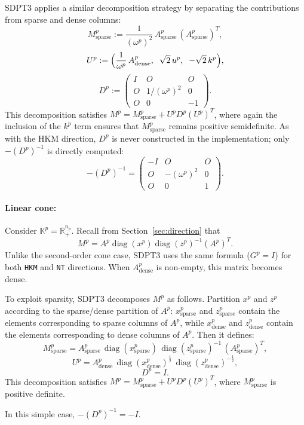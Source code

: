 SDPT3 applies a similar decomposition strategy by separating 
the contributions from sparse and dense columns:
\[
  M^p_{\mathrm{sparse}}
    := \frac{1}{(\omega^p)^2} \, A^p_{\mathrm{sparse}}\,(A^p_{\mathrm{sparse}})^T,
\]
\[
  U^p
    := \Bigl(
      \frac{1}{\omega^p}\,A^p_{\mathrm{dense}},
       \;\; \sqrt{2}\,u^p,
       \;\; -\sqrt{2}\,k^p
    \Bigr),
\]
\[
  D^p
    := \begin{pmatrix}
         I & O & O \\
         O & 1/(\omega^p)^2 & 0  \\
         O & 0 & -1 
       \end{pmatrix}.
\]
This decomposition satisfies $M^p = M^p_{\mathrm{sparse}} + U^p D^p (U^p)^T$,
where again the inclusion of the $k^p$ term ensures that $M^p_{\mathrm{sparse}}$ 
remains positive semidefinite.
As with the HKM direction, $D^p$ is never constructed in the implementation;
only $-(D^p)^{-1}$ is directly computed:
\[
  -(D^p)^{-1}
  = \begin{pmatrix}
      -I & O & O  \\
      O & -(\omega^p)^2 & 0  \\
      O & 0 & 1
    \end{pmatrix}.
\]


\paragraph{Linear cone:}
Consider $\mathbb{K}^p = \mathbb{R}^{n_p}_+$. 
Recall from Section~\ref{sec:direction} that
\[
  M^p = A^p \operatorname{diag}(x^p) \operatorname{diag}(z^p)^{-1} (A^p)^T.
\]
Unlike the second-order cone case, SDPT3 uses the same formula ($G^p=I$) 
for both \texttt{HKM} and \texttt{NT} directions.
When $A^p_{\mathrm{dense}}$ is non-empty, this matrix becomes dense.

To exploit sparsity, SDPT3 decomposes $M^p$ as follows.
Partition $x^p$ and $z^p$ according to the sparse/dense partition of $A^p$:
$x^p_{\mathrm{sparse}}$ and $z^p_{\mathrm{sparse}}$ contain the elements corresponding to sparse columns of $A^p$,
while $x^p_{\mathrm{dense}}$ and $z^p_{\mathrm{dense}}$ contain the elements corresponding to dense columns of $A^p$.
Then it defines:
\[
   M^p_{\mathrm{sparse}}
   = A^p_{\mathrm{sparse}}
     \,\operatorname{diag}(x^p_{\mathrm{sparse}})
     \,\operatorname{diag}(z^p_{\mathrm{sparse}})^{-1}
     \,(A^p_{\mathrm{sparse}})^T,
\]
\[
   U^p
   = A^p_{\mathrm{dense}}
     \,\operatorname{diag}(x^p_{\mathrm{dense}})^{\tfrac12}
     \,\operatorname{diag}(z^p_{\mathrm{dense}})^{-\tfrac12},
\]
\[ D^p = I. \]
This decomposition satisfies $M^p = M^p_{\mathrm{sparse}} + U^p D^p (U^p)^T$,
where $M^p_{\mathrm{sparse}}$ is positive definite.

In this simple case, $-(D^p)^{-1} = -I$.
